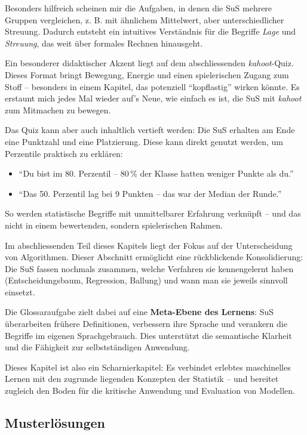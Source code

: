 Besonders hilfreich scheinen mir die Aufgaben, in denen die SuS mehrere Gruppen vergleichen, z. B. mit ähnlichem Mittelwert, aber unterschiedlicher Streuung. Dadurch entsteht ein intuitives Verständnis für die Begriffe \emph{Lage} und \emph{Streuung}, das weit über formales Rechnen hinausgeht.

Ein besonderer didaktischer Akzent liegt auf dem abschliessenden \textit{kahoot}-Quiz. Dieses Format bringt Bewegung, Energie und einen spielerischen Zugang zum Stoff – besonders in einem Kapitel, das potenziell ``kopflastig'' wirken könnte. Es erstaunt mich jedes Mal wieder auf's Neue, wie einfach es ist, die SuS mit \textit{kahoot} zum Mitmachen zu bewegen.

Das Quiz kann aber auch inhaltlich vertieft werden: Die SuS erhalten am Ende eine Punktzahl und eine Platzierung. Diese kann direkt genutzt werden, um Perzentile praktisch zu erklären:

\begin{itemize}
  \item ``Du bist im 80. Perzentil – 80\,\% der Klasse hatten weniger Punkte als du.''
  \item ``Das 50. Perzentil lag bei 9 Punkten – das war der Median der Runde.''
\end{itemize}

So werden statistische Begriffe mit unmittelbarer Erfahrung verknüpft – und das nicht in einem bewertenden, sondern spielerischen Rahmen. 

Im abschliessenden Teil dieses Kapitels liegt der Fokus auf der Unterscheidung von Algorithmen. Dieser Abschnitt ermöglicht eine rückblickende Konsolidierung: Die SuS fassen nochmals zusammen, welche Verfahren sie kennengelernt haben (Entscheidungsbaum, Regression, Ballung) und wann man sie jeweils sinnvoll einsetzt.

Die Glossaraufgabe zielt dabei auf eine \textbf{Meta-Ebene des Lernens}: SuS überarbeiten frühere Definitionen, verbessern ihre Sprache und verankern die Begriffe im eigenen Sprachgebrauch. Dies unterstützt die semantische Klarheit und die Fähigkeit zur selbstständigen Anwendung.

Dieses Kapitel ist also ein Scharnierkapitel: Es verbindet erlebtes maschinelles Lernen mit den zugrunde liegenden Konzepten der Statistik – und bereitet zugleich den Boden für die kritische Anwendung und Evaluation von Modellen.





\subsection*{Musterlösungen}

